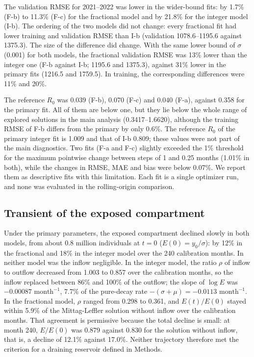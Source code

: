 \documentclass[pdflatex,sn-mathphys-ay]{sn-jnl}
\begin{document}


The validation RMSE for 2021--2022 was lower in the wider-bound fits: by 1.7\% (F-b) to 11.3\% (F-c) for the fractional model and by 21.8\% for the integer model (I-b). The ordering of the two models did not change: every fractional fit had lower training and validation RMSE than I-b (validation 1078.6--1195.6 against 1375.3). The size of the difference did change. With the same lower bound of $\sigma$ (0.001) for both models, the fractional validation RMSE was 13\% lower than the integer one (F-b against I-b; 1195.6 and 1375.3), against 31\% lower in the primary fits (1216.5 and 1759.5). In training, the corresponding differences were 11\% and 20\%.

The reference $R_0$ was 0.039 (F-b), 0.070 (F-c) and 0.040 (F-a), against 0.358 for the primary fit. All of them are below one, but they lie below the whole range of explored solutions in the main analysis (0.3417--1.6620), although the training RMSE of F-b differs from the primary by only 0.6\%. The reference $R_0$ of the primary integer fit is 1.009 and that of I-b 0.809; these values were not part of the main diagnostics. Two fits (F-a and F-c) slightly exceeded the 1\% threshold for the maximum pointwise change between steps of 1 and 0.25 months (1.01\% in both), while the changes in RMSE, MAE and bias were below 0.07\%. We report them as descriptive fits with this limitation. Each fit is a single optimizer run, and none was evaluated in the rolling-origin comparison.

\subsection{Transient of the exposed compartment}\label{sec:trans}

Under the primary parameters, the exposed compartment declined slowly in both models, from about 0.8 million individuals at $t=0$ ($E(0)=y_0/\sigma$): by 12\% in the fractional and 18\% in the integer model over the 240 calibration months. In neither model was the inflow negligible. In the integer model, the ratio $\rho$ of inflow to outflow decreased from 1.003 to 0.857 over the calibration months, so the inflow replaced between 86\% and 100\% of the outflow; the slope of $\log E$ was $-0.00087\text{ month}^{-1}$, 7.7\% of the pure-decay rate $-(\sigma+\mu)=-0.0113\text{ month}^{-1}$. In the fractional model, $\rho$ ranged from 0.298 to 0.361, and $E(t)/E(0)$ stayed within 5.9\% of the Mittag-Leffler solution without inflow over the calibration months. That agreement is permissive because the total decline is small: at month 240, $E/E(0)$ was 0.879 against 0.830 for the solution without inflow, that is, a decline of 12.1\% against 17.0\%. Neither trajectory therefore met the criterion for a draining reservoir defined in Methods.
\end{document}
